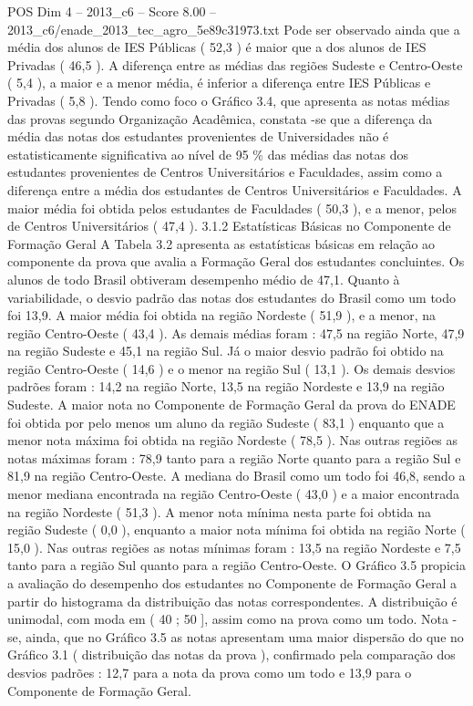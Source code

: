 \begin{textsample}{POS Dim 4 – 2013\_c6 – Score 8.00 – 2013\_c6/enade\_2013\_tec\_agro\_5e89c31973.txt}
Pode ser observado ainda que a média dos alunos de IES Públicas ( 52,3 ) é maior que a dos alunos de IES Privadas ( 46,5 ).
A diferença entre as médias das regiões Sudeste e Centro-Oeste ( 5,4 ), a maior e a menor média, é inferior a diferença entre IES Públicas e Privadas ( 5,8 ).
Tendo como foco o Gráfico 3.4, que apresenta as notas médias das provas segundo Organização Acadêmica, constata -se que a diferença da média das notas dos estudantes provenientes de Universidades não é estatisticamente significativa ao nível de 95 \% das médias das notas dos estudantes provenientes de Centros Universitários e Faculdades, assim como a diferença entre a média dos estudantes de Centros Universitários e Faculdades.
A maior média foi obtida pelos estudantes de Faculdades ( 50,3 ), e a menor, pelos de Centros Universitários ( 47,4 ). 3.1.2 Estatísticas Básicas no Componente de Formação Geral A Tabela 3.2 apresenta as estatísticas básicas em relação ao componente da prova que avalia a Formação Geral dos estudantes concluintes.
Os alunos de todo Brasil obtiveram desempenho médio de 47,1.
Quanto à variabilidade, o desvio padrão das notas dos estudantes do Brasil como um todo foi 13,9.
A maior média foi obtida na região Nordeste ( 51,9 ), e a menor, na região Centro-Oeste ( 43,4 ).
As demais médias foram : 47,5 na região Norte, 47,9 na região Sudeste e 45,1 na região Sul.
Já o maior desvio padrão foi obtido na região Centro-Oeste ( 14,6 ) e o menor na região Sul ( 13,1 ).
Os demais desvios padrões foram : 14,2 na região Norte, 13,5 na região Nordeste e 13,9 na região Sudeste.
A maior nota no Componente de Formação Geral da prova do ENADE foi obtida por pelo menos um aluno da região Sudeste ( 83,1 ) enquanto que a menor nota máxima foi obtida na região Nordeste ( 78,5 ).
Nas outras regiões as notas máximas foram : 78,9 tanto para a região Norte quanto para a região Sul e 81,9 na região Centro-Oeste.
A mediana do Brasil como um todo foi 46,8, sendo a menor mediana encontrada na região Centro-Oeste ( 43,0 ) e a maior encontrada na região Nordeste ( 51,3 ).
A menor nota mínima nesta parte foi obtida na região Sudeste ( 0,0 ), enquanto a maior nota mínima foi obtida na região Norte ( 15,0 ).
Nas outras regiões as notas mínimas foram : 13,5 na região Nordeste e 7,5 tanto para a região Sul quanto para a região Centro-Oeste.
O Gráfico 3.5 propicia a avaliação do desempenho dos estudantes no Componente de Formação Geral a partir do histograma da distribuição das notas correspondentes.
A distribuição é unimodal, com moda em ( 40 ; 50 ], assim como na prova como um todo.
Nota -se, ainda, que no Gráfico 3.5 as notas apresentam uma maior dispersão do que no Gráfico 3.1 ( distribuição das notas da prova ), confirmado pela comparação dos desvios padrões : 12,7 para a nota da prova como um todo e 13,9 para o Componente de Formação Geral.

\end{textsample}
